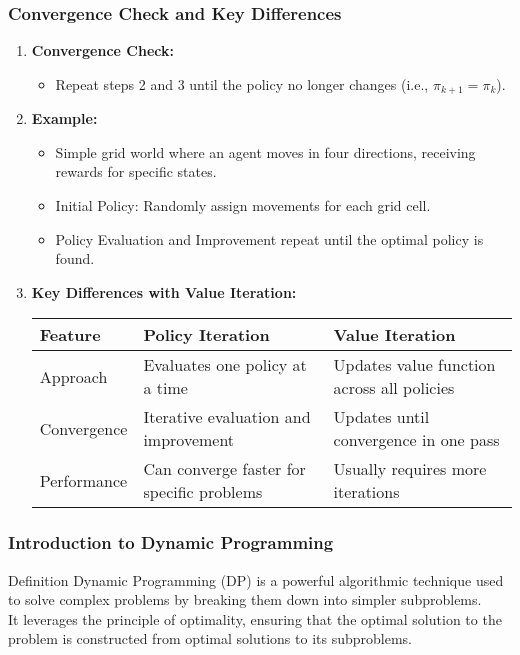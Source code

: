 \documentclass[aspectratio=169]{beamer}
\begin{document}
\begin{frame}[fragile]
    \frametitle{Convergence Check and Key Differences}
    \begin{enumerate}
        \item \textbf{Convergence Check:}
        \begin{itemize}
            \item Repeat steps 2 and 3 until the policy no longer changes (i.e., \( \pi_{k+1} = \pi_k \)).
        \end{itemize}
        
        \item \textbf{Example:}
        \begin{itemize}
            \item Simple grid world where an agent moves in four directions, receiving rewards for specific states.
            \item Initial Policy: Randomly assign movements for each grid cell.
            \item Policy Evaluation and Improvement repeat until the optimal policy is found.
        \end{itemize}
        
        \item \textbf{Key Differences with Value Iteration:}
        \begin{tabular}{|l|l|l|}
            \hline
            \textbf{Feature}       & \textbf{Policy Iteration} & \textbf{Value Iteration} \\ \hline
            Approach               & Evaluates one policy at a time & Updates value function across all policies \\ \hline
            Convergence            & Iterative evaluation and improvement & Updates until convergence in one pass \\ \hline
            Performance            & Can converge faster for specific problems & Usually requires more iterations \\ \hline
        \end{tabular}
    \end{enumerate}
\end{frame}

\begin{frame}[fragile]
    \frametitle{Introduction to Dynamic Programming}
    \begin{block}{Definition}
        Dynamic Programming (DP) is a powerful algorithmic technique used to solve complex problems by breaking them down into simpler subproblems. 
        \\
        It leverages the principle of optimality, ensuring that the optimal solution to the problem is constructed from optimal solutions to its subproblems.
    \end{block}
\end{frame}
\end{document}
